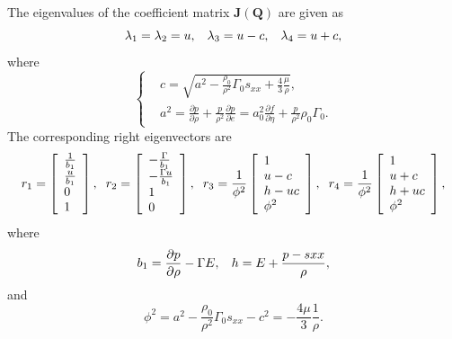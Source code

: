 \documentclass{article}
\numberwithin{equation}{section}
\numberwithin{table}{section}
\begin{document}
The eigenvalues of the coefficient matrix $\bm{J}(\bm{Q})$ are given as
\begin{equation}
  \lambda_1 =\lambda_2 = u, \hspace{0.3cm} \lambda_3 = u-c, \hspace{0.3cm} \lambda_4 = u+c,
\end{equation}
where 
\begin{equation}
  \left\{ \begin{aligned}
	  & c = \sqrt{a^2-\frac{\rho_0}{\rho^2}\Gamma_0 s_{xx} +\frac{4}{3}\frac{\mu}{\rho}},\\
	&	a^2 = \frac{\partial p}{\partial \rho} + \frac{p}{\rho^2}\frac{\partial p}{\partial e} = a^2_0 \frac{\partial f}{\partial \eta} + \frac{p}{\rho^2}\rho_0 \Gamma_0.
	  \end{aligned} \right.
	\end{equation}
The corresponding right eigenvectors are 
\begin{equation}\label{eq:eiv}
  r_1 = \left[ \begin{array}{l}
	  \frac{1}{b_1} \\
	  \frac{u}{b_1} \\
	  0 \\
	  1 \\
	\end{array}
	\right], \hspace{0.2cm} 
	r_2= \left[ \begin{array}{l}
		-\frac{\Gamma}{b_1} \\
		-\frac{\Gamma u}{b_1} \\
		1 \\ 
		0\\
	  \end{array}
	\right], \hspace{0.2cm}
r_3 =	\frac{1}{\phi^2}\left[\begin{array}{l}
		1 \\
		u-c \\
		h -uc \\
		\phi^2
	  \end{array}
	\right], \hspace{0.2cm}
r_4 = \frac{1}{\phi^2}\left[\begin{array}{l}
		1 \\
		u+c \\
		h +uc \\
		\phi^2
	  \end{array}
	\right],
  \end{equation}
  where 
  \begin{equation}
	b_1 = \frac{\partial p}{\partial \rho} - \Gamma E, \hspace{0.3cm} h = E +\frac{p-s{xx}}{\rho},
  \end{equation}
  and
  \begin{equation}
	\phi^2 = a^2 -\frac{\rho_0}{\rho^2} \Gamma_0 s_{xx}-c^2 = -\frac{4\mu}{3}\frac{1}{\rho}.
  \end{equation}
\end{document}
